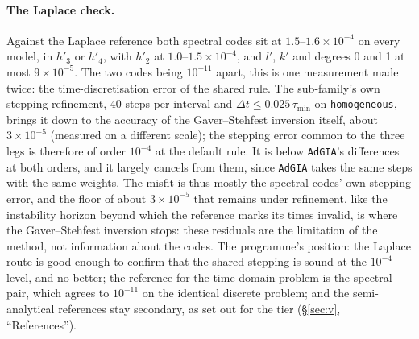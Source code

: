 \documentclass[11pt]{article}
\numberwithin{equation}{section}
\newcommand{\code}[1]{\texttt{#1}}
\begin{document}
\paragraph{The Laplace check.} Against the Laplace reference both spectral
codes sit at $1.5$--$1.6\times10^{-4}$ on every model, in $h'_3$ or $h'_4$,
with $h'_2$ at $1.0$--$1.5\times10^{-4}$, and $l'$, $k'$ and degrees 0 and 1
at most $9\times10^{-5}$. The two codes being $10^{-11}$ apart, this is one
measurement made twice: the time-discretisation error of the shared rule.
The sub-family's own stepping refinement, 40 steps per interval and
$\Delta t\le0.025\,\tau_{\min}$ on \code{homogeneous}, brings it down to
the accuracy of the Gaver--Stehfest inversion itself, about
$3\times10^{-5}$ (measured on a different scale); the stepping error
common to the three legs is therefore of order $10^{-4}$ at the default
rule. It is below \code{AdGIA}'s differences at
both orders, and it largely cancels from them, since \code{AdGIA} takes
the same steps with the same weights. The misfit is thus mostly the
spectral codes' own stepping error, and the floor of about
$3\times10^{-5}$ that remains under refinement, like the instability
horizon beyond which the reference marks its times invalid, is where the
Gaver--Stehfest inversion stops: these residuals are the limitation of the
method, not information about the codes. The programme's position: the
Laplace route is good enough to confirm that the shared
stepping is sound at the $10^{-4}$ level, and no better; the reference for
the time-domain problem is the spectral pair, which agrees to $10^{-11}$ on
the identical discrete problem; and the semi-analytical references stay
secondary, as set out for the tier (\S\ref{sec:v}, ``References'').
\end{document}
